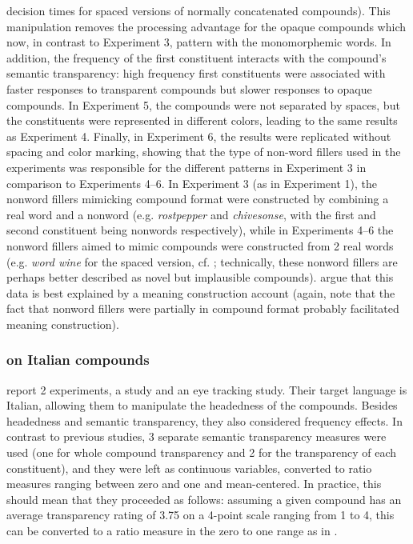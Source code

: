 decision times for spaced versions of normally concatenated
compounds). This manipulation removes the processing advantage for the
opaque compounds which now, in contrast to Experiment 3, pattern with the monomorphemic words. In
addition, the frequency of the first constituent interacts with the
compound's semantic transparency: high frequency first constituents were associated with
faster responses to transparent compounds but slower responses to
opaque compounds. In Experiment 5, the compounds were not separated
by spaces, but the constituents were represented in different colors,
leading to the same results as Experiment 4. Finally, in Experiment
6, the results were replicated without spacing and color marking, showing
that the type of non-word fillers used in the experiments was
responsible for the different patterns in Experiment 3 in
comparison to Experiments 4--6. In Experiment 3 (as in
Experiment 1), the nonword
fillers mimicking compound format were constructed by combining a real
word and a nonword (e.g. \emph{rostpepper} and \emph{chivesonse}, with the
first and second constituent being nonwords respectively),
while in Experiments 4--6 the
nonword fillers aimed to mimic compounds were constructed from 2
real words (e.g. \emph{word
  wine} for the spaced version, cf. \citealt[414]{Jietal:2011};
technically, these nonword fillers are perhaps better described as
novel but implausible compounds). 
\citet{Jietal:2011} argue that this data is best explained by a
meaning construction account (again, note that the fact that nonword
fillers were partially in compound format probably facilitated meaning
construction). %


\subsubsection{\citet{MarelliandLuzzatti:2012} on Italian compounds}
\label{sec:marelliluzuatti2012}

\citet{MarelliandLuzzatti:2012} report 2 experiments, a 
 study and an eye tracking study. Their target language is
Italian, allowing them to manipulate the headedness of the
compounds. 
Besides headedness and semantic transparency, they
also considered  frequency effects. In contrast to previous studies,
3 separate semantic transparency measures were used (one for whole
compound transparency and 2 for the transparency of each
constituent), and they were left as continuous variables, converted to
ratio measures ranging between zero and one and mean-centered. In practice, this
should mean that they proceeded as follows: assuming a given
compound has an average transparency rating of 3.75 on a 4-point
scale ranging from 1 to 4, this can be converted to a ratio measure
in the zero to one range as in \Next.

